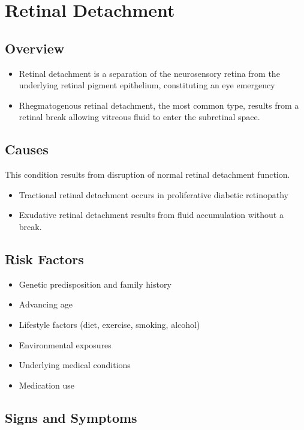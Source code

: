 \chapter{Retinal Detachment}
\label{sec:Retinal Detachment}

\section{Overview}


\begin{itemize}[noitemsep]
  \item Retinal detachment is a separation of the neurosensory retina from the underlying retinal pigment epithelium, constituting an eye emergency
  \item Rhegmatogenous retinal detachment, the most common type, results from a retinal break allowing vitreous fluid to enter the subretinal space.
\end{itemize}
\section{Causes}
This condition results from disruption of normal retinal detachment function.

\begin{itemize}[noitemsep]
  \item Tractional retinal detachment occurs in proliferative diabetic retinopathy
  \item Exudative retinal detachment results from fluid accumulation without a break.
\end{itemize}
\section{Risk Factors}


\begin{itemize}[noitemsep]
  \item Genetic predisposition and family history
  \item Advancing age
  \item Lifestyle factors (diet, exercise, smoking, alcohol)
  \item Environmental exposures
  \item Underlying medical conditions
  \item Medication use
\end{itemize}
\section{Signs and Symptoms}

